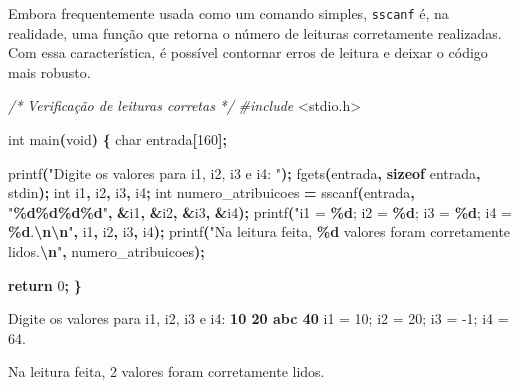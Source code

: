 \documentclass[
  11pt,
  a4paper,
]{scrbook}
\newenvironment{Shaded}{\begin{snugshade}}{\end{snugshade}}
\newcommand{\CommentTok}[1]{\textcolor[rgb]{0.56,0.35,0.01}{\textit{#1}}}
\newcommand{\ControlFlowTok}[1]{\textcolor[rgb]{0.13,0.29,0.53}{\textbf{#1}}}
\newcommand{\DataTypeTok}[1]{\textcolor[rgb]{0.13,0.29,0.53}{#1}}
\newcommand{\DecValTok}[1]{\textcolor[rgb]{0.00,0.00,0.81}{#1}}
\newcommand{\ImportTok}[1]{#1}
\newcommand{\KeywordTok}[1]{\textcolor[rgb]{0.13,0.29,0.53}{\textbf{#1}}}
\newcommand{\NormalTok}[1]{#1}
\newcommand{\OperatorTok}[1]{\textcolor[rgb]{0.81,0.36,0.00}{\textbf{#1}}}
\newcommand{\PreprocessorTok}[1]{\textcolor[rgb]{0.56,0.35,0.01}{\textit{#1}}}
\newcommand{\SpecialCharTok}[1]{\textcolor[rgb]{0.81,0.36,0.00}{\textbf{#1}}}
\newcommand{\StringTok}[1]{\textcolor[rgb]{0.31,0.60,0.02}{#1}}
\begin{document}
Embora frequentemente usada como um comando simples, \texttt{sscanf} é,
na realidade, uma função que retorna o número de leituras corretamente
realizadas. Com essa característica, é possível contornar erros de
leitura e deixar o código mais robusto.

\begin{Shaded}
\begin{Highlighting}[]
\CommentTok{/*}
\CommentTok{Verificação de leituras corretas}
\CommentTok{*/}
\PreprocessorTok{\#include }\ImportTok{\textless{}stdio.h\textgreater{}}

\DataTypeTok{int}\NormalTok{ main}\OperatorTok{(}\DataTypeTok{void}\OperatorTok{)} \OperatorTok{\{}
    \DataTypeTok{char}\NormalTok{ entrada}\OperatorTok{[}\DecValTok{160}\OperatorTok{];}

\NormalTok{    printf}\OperatorTok{(}\StringTok{"Digite os valores para i1, i2, i3 e i4: "}\OperatorTok{);}
\NormalTok{    fgets}\OperatorTok{(}\NormalTok{entrada}\OperatorTok{,} \KeywordTok{sizeof}\NormalTok{ entrada}\OperatorTok{,}\NormalTok{ stdin}\OperatorTok{);}
    \DataTypeTok{int}\NormalTok{ i1}\OperatorTok{,}\NormalTok{ i2}\OperatorTok{,}\NormalTok{ i3}\OperatorTok{,}\NormalTok{ i4}\OperatorTok{;}
    \DataTypeTok{int}\NormalTok{ numero\_atribuicoes }\OperatorTok{=}\NormalTok{ sscanf}\OperatorTok{(}\NormalTok{entrada}\OperatorTok{,} \StringTok{"}\SpecialCharTok{\%d\%d\%d\%d}\StringTok{"}\OperatorTok{,} \OperatorTok{\&}\NormalTok{i1}\OperatorTok{,} \OperatorTok{\&}\NormalTok{i2}\OperatorTok{,} \OperatorTok{\&}\NormalTok{i3}\OperatorTok{,} \OperatorTok{\&}\NormalTok{i4}\OperatorTok{);}
\NormalTok{    printf}\OperatorTok{(}\StringTok{"i1 = }\SpecialCharTok{\%d}\StringTok{; i2 = }\SpecialCharTok{\%d}\StringTok{; i3 = }\SpecialCharTok{\%d}\StringTok{; i4 = }\SpecialCharTok{\%d}\StringTok{.}\SpecialCharTok{\textbackslash{}n\textbackslash{}n}\StringTok{"}\OperatorTok{,}\NormalTok{ i1}\OperatorTok{,}\NormalTok{ i2}\OperatorTok{,}\NormalTok{ i3}\OperatorTok{,}\NormalTok{ i4}\OperatorTok{);}
\NormalTok{    printf}\OperatorTok{(}\StringTok{"Na leitura feita, }\SpecialCharTok{\%d}\StringTok{ valores foram corretamente lidos.}\SpecialCharTok{\textbackslash{}n}\StringTok{"}\OperatorTok{,}
\NormalTok{        numero\_atribuicoes}\OperatorTok{);}

    \ControlFlowTok{return} \DecValTok{0}\OperatorTok{;}
\OperatorTok{\}}
\end{Highlighting}
\end{Shaded}

\begin{Shaded}
\begin{Highlighting}[]
\NormalTok{Digite os valores para i1, i2, i3 e i4: }\KeywordTok{ 10 20 abc 40 }
\NormalTok{i1 = 10; i2 = 20; i3 = {-}1; i4 = 64.}

\NormalTok{Na leitura feita, 2 valores foram corretamente lidos.}
\end{Highlighting}
\end{Shaded}
\end{document}
